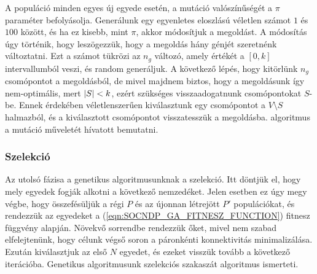 A populáció minden egyes új egyede esetén, a mutáció valószínűségét a $\pi$ paraméter befolyásolja.
Generálunk egy egyenletes eloszlású véletlen számot $1$ és $100$ között, és ha ez kisebb, mint $\pi$, akkor módosítjuk a megoldást.
A módosítás úgy történik, hogy leszögezzük, hogy a megoldás hány génjét szeretnénk változtatni.
Ezt a számot tükrözi az $n_{g}$ változó, amely értékét a $\left[0, k\right]$ intervallumból veszi, és random generáljuk.
A következő lépés, hogy kitörlünk $n_{g}$ csomópontot a megoldásból, de mivel majdnem biztos,
hogy a megoldásunk így nem-optimális, mert $\lvert S\rvert < k$, ezért szükséges visszaadogatnunk csomópontokat $S$-be.
Ennek érdekében véletlenszerűen kiválasztunk egy csomópontot a $V \setminus S$ halmazból,
és a kiválasztott csomópontot visszatesszük a megoldásba.
 algoritmus a mutáció műveletét hívatott bemutatni.



\subsubsection{Szelekció}
Az utolsó fázisa a genetikus algoritmusunknak a szelekció.
Itt döntjük el, hogy mely egyedek fogják alkotni a következő nemzedéket.
Jelen esetben ez úgy megy végbe, hogy összefésüljük a régi $P$ és az újonnan létrejött $P'$ populációkat,
és rendezzük az egyedeket a (\ref{eqn:SOCNDP_GA_FITNESZ_FUNCTION}) fitnesz függvény alapján.
Növekvő sorrendbe rendezzük őket, mivel nem szabad elfelejtenünk, hogy célunk végső soron a páronkénti konnektivitás minimalizálása.
Ezután kiválasztjuk az első $N$ egyedet, és ezeket visszük tovább a következő iterációba.
Genetikus algoritmusunk szelekciós szakaszát  algoritmus ismerteti.

